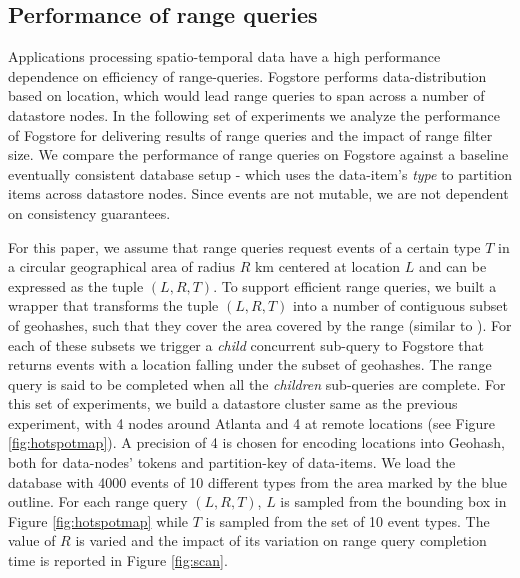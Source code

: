\subsection{Performance of range queries}
Applications processing spatio-temporal data have a high performance dependence on efficiency of range-queries. Fogstore performs data-distribution based on location, which would lead range queries to span across a number of datastore nodes. In the following set of experiments we analyze the performance of Fogstore for delivering results of range queries and the impact of range filter size. We compare the performance of range queries on Fogstore against a baseline eventually consistent database setup - which uses the data-item's \emph{type} to partition items across datastore nodes. Since events are not mutable, we are not dependent on consistency guarantees.
\par For this paper, we assume that range queries request events of a certain type $T$ in a circular geographical area of radius $R$ km centered at location $L$ and can be expressed as the tuple $(L, R, T)$. To support efficient range queries, we built a wrapper that transforms the tuple $(L, R, T)$ into a number of contiguous subset of geohashes, such that they cover the area covered by the range (similar to \cite{spatialcassandra}). For each of these subsets we trigger a \emph{child} concurrent sub-query to Fogstore that returns events with a location falling under the subset of geohashes. The range query is said to be completed when all the \emph{children} sub-queries are complete. For this set of experiments, we build a datastore cluster same as the previous experiment, with 4 nodes around Atlanta and 4 at remote locations (see Figure \ref{fig:hotspotmap}). A precision of 4 is chosen for encoding locations into Geohash, both for data-nodes' tokens and partition-key of data-items. We load the database with 4000 events of 10 different types from the area marked by the blue outline. For each range query $(L, R, T)$, $L$ is sampled from the bounding box in Figure \ref{fig:hotspotmap} while $T$ is sampled from the set of 10 event types. The value of $R$ is varied and the impact of its variation on range query completion time is reported in Figure \ref{fig:scan}. 

